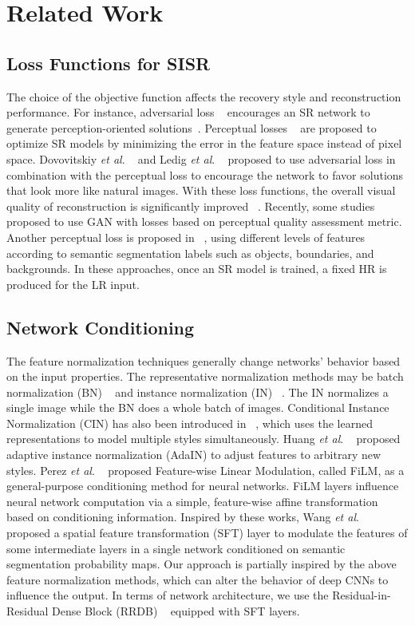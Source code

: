 \documentclass{article}
\newcommand{\etal}{\textit{et al}. }
\begin{document}
\section{Related Work}
\subsection{Loss Functions for SISR}
The choice of the objective function affects the recovery style and reconstruction performance. For instance, adversarial loss ~\cite{goodfellow2014generative} encourages an SR network to generate perception-oriented solutions~\cite{denton2015deep, xu2017learning, ren2020real, agustsson2017ntire}. Perceptual losses ~\cite{BrunaSL15, johnson2016perceptual} are proposed to optimize SR models by minimizing the error in the feature space instead of pixel space. Dovovitskiy \etal~\cite{dosovitskiy2016generating} and Ledig \etal~\cite{2017photo} proposed to use adversarial loss in combination with the perceptual loss to encourage the network to favor solutions that look more like natural images. With these loss functions, the overall visual quality of reconstruction is significantly improved ~\cite{Hui-PPON-2021, zhang2020ntire, tariq2020deep}. Recently, some studies ~\cite{lugmayr2019aim,jo2020investigating,yan2019deep} proposed to use GAN with losses based on perceptual quality assessment metric. Another perceptual loss is proposed in ~\cite{rad2019srobb}, using different levels of features according to semantic segmentation labels such as objects, boundaries, and backgrounds. In these approaches, once an SR model is trained, a fixed HR is produced for the LR input.
\subsection{Network Conditioning}
The feature normalization techniques generally change networks' behavior based on the input properties. The representative normalization methods may be batch normalization (BN) ~\cite{ICML-2015-IoffeS} and instance normalization (IN) ~\cite{UlyanovVL16}. The IN normalizes a single image while the BN does a whole batch of images. Conditional Instance Normalization (CIN) has also been introduced in ~\cite{DumoulinSK16}, which uses the learned representations to model multiple styles simultaneously. Huang \etal~\cite{huang2017arbitrary} proposed adaptive instance normalization (AdaIN) to adjust features to arbitrary new styles. Perez \etal~\cite{perez2018film} proposed Feature-wise Linear Modulation, called FiLM, as a general-purpose conditioning method for neural networks. FiLM layers influence neural network computation via a simple, feature-wise affine transformation based on conditioning information. Inspired by these works, Wang \etal~\cite{2018recovering} proposed a spatial feature transformation (SFT) layer to modulate the features of some intermediate layers in a single network conditioned on semantic segmentation probability maps.
Our approach is partially inspired by the above feature normalization methods, which can alter the behavior of deep CNNs to influence the output. In terms of network architecture, we use the Residual-in-Residual Dense Block (RRDB) ~\cite{2018esrgan} equipped with SFT layers.
\end{document}
